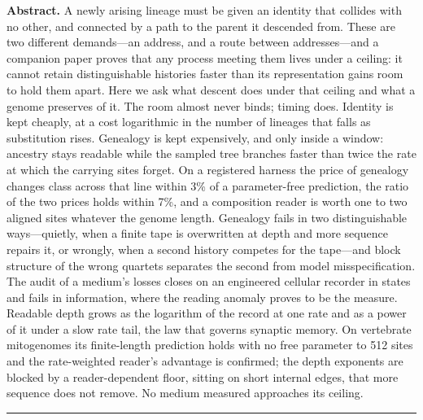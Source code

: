 \documentclass[11pt]{article}
\begin{document}
\vspace{6pt}
\noindent\textbf{Abstract.}
A newly arising lineage must be given an identity that collides with no other, and connected by a path to the parent it descended from. These are two different demands---an address, and a route between addresses---and a companion paper proves that any process meeting them lives under a ceiling: it cannot retain distinguishable histories faster than its representation gains room to hold them apart. Here we ask what descent does under that ceiling and what a genome preserves of it. The room almost never binds; timing does. Identity is kept cheaply, at a cost logarithmic in the number of lineages that falls as substitution rises. Genealogy is kept expensively, and only inside a window: ancestry stays readable while the sampled tree branches faster than twice the rate at which the carrying sites forget. On a registered harness the price of genealogy changes class across that line within 3\% of a parameter-free prediction, the ratio of the two prices holds within 7\%, and a composition reader is worth one to two aligned sites whatever the genome length. Genealogy fails in two distinguishable ways---quietly, when a finite tape is overwritten at depth and more sequence repairs it, or wrongly, when a second history competes for the tape---and block structure of the wrong quartets separates the second from model misspecification. The audit of a medium's losses closes on an engineered cellular recorder in states and fails in information, where the reading anomaly proves to be the measure. Readable depth grows as the logarithm of the record at one rate and as a power of it under a slow rate tail, the law that governs synaptic memory. On vertebrate mitogenomes its finite-length prediction holds with no free parameter to 512 sites and the rate-weighted reader's advantage is confirmed; the depth exponents are blocked by a reader-dependent floor, sitting on short internal edges, that more sequence does not remove. No medium measured approaches its ceiling.

\vspace{4pt}

\vspace{8pt}\noindent\rule{\textwidth}{0.4pt}
\newpage\setcounter{page}{1}

\end{document}
